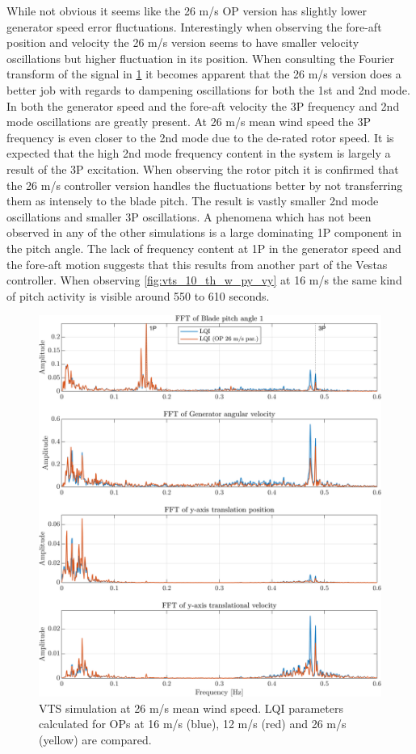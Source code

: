 While not obvious it seems like the 26 m/s OP version has slightly lower generator speed error fluctuations. Interestingly when observing the fore-aft position and velocity the 26 m/s version seems to have smaller velocity oscillations but higher fluctuation in its position. When consulting the Fourier transform of the signal in \cref{fig:vts_31_fft_th_w_py_vy} it becomes apparent that the 26 m/s version does a better job with regards to dampening oscillations for both the 1st and 2nd mode. In both the generator speed and the fore-aft velocity the 3P frequency and 2nd mode oscillations are greatly present. At 26 m/s mean wind speed the 3P frequency is even closer to the 2nd mode due to the de-rated rotor speed. It is expected that the high 2nd mode frequency content in the system is largely a result of the 3P excitation. When observing the rotor pitch it is confirmed that the 26 m/s controller version handles the fluctuations better by not transferring them as intensely to the blade pitch. The result is vastly smaller 2nd mode oscillations and smaller 3P oscillations. A phenomena which has not been observed in any of the other simulations is a large dominating 1P component in the pitch angle. The lack of frequency content at 1P in the generator speed and the fore-aft motion suggests that this results from another part of the Vestas controller. When observing \cref{fig:vts_10_th_w_py_vy} at 16 m/s the same kind of pitch activity is visible around 550 to 610 seconds.
\begin{figure}[h]
	\centering
	\includegraphics[width=0.7\linewidth]{Graphics/TestResults/VTSplotting/31_fft_th_w_py_vy.png}
	\caption{VTS simulation at 26 m/s mean wind speed. LQI parameters calculated for OPs at 16 m/s (blue), 12 m/s (red) and 26 m/s (yellow) are compared.}
	\label{fig:vts_31_fft_th_w_py_vy}
\end{figure}

